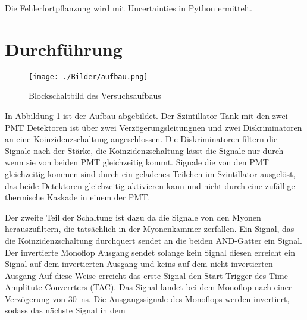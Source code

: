 Die Fehlerfortpflanzung wird mit Uncertainties in Python \cite{uncertainties} ermittelt.


\section{Durchführung \cite{man}}

\begin{figure}
	\centering
	\texttt{[image: ./Bilder/aufbau.png]}
	\caption{Blockschaltbild des Versuchsaufbaus}\label{fig:aufbau}
\end{figure}

In Abbildung \ref{fig:aufbau} ist der Aufbau abgebildet.
Der Szintillator Tank mit den zwei PMT Detektoren ist über zwei Verzögerungsleitungnen
und zwei Diskriminatoren an eine Koinzidenzschaltung angeschlossen. 
Die Diskriminatoren filtern die Signale nach der Stärke, die Koinzidenzschaltung
lässt die Signale nur durch wenn sie von beiden PMT gleichzeitig kommt.
Signale die von den PMT gleichzeitig kommen sind durch ein geladenes Teilchen im Szintillator
ausgelöst, das beide Detektoren gleichzeitig aktivieren kann und nicht durch eine zufällige 
thermische Kaskade in einem der PMT.

Der zweite Teil der Schaltung ist dazu da die Signale von den Myonen herauszufiltern, die tatsächlich
in der Myonenkammer zerfallen. Ein Signal, das die Koinzidenzschaltung durchquert
sendet an die beiden AND-Gatter ein Signal. Der invertierte Monoflop Ausgang sendet solange kein
Signal diesen erreicht ein Signal auf dem invertierten Ausgang und keins auf dem nicht invertierten Ausgang
Auf diese Weise erreicht das erste Signal den Start Trigger des Time-Amplitute-Converrters (TAC).
Das Signal landet bei dem Monoflop nach einer Verzögerung von \qty{30}{\ns}. 
Die Ausgangssignale des Monoflops werden invertiert, sodass das nächste Signal in dem 


